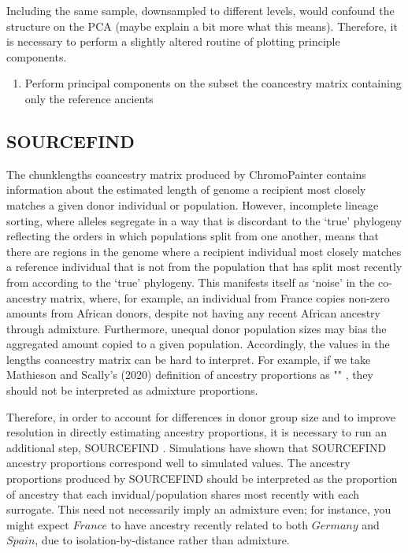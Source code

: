 Including the same sample, downsampled to different levels, would confound the structure on the PCA (maybe explain a bit more what this means). Therefore, it is necessary to perform a slightly altered routine of plotting principle components. 

\begin{enumerate}
\item Perform principal components on the subset the coancestry matrix containing only the reference ancients
\end{enumerate}



\subsection{SOURCEFIND}

The chunklengths coancestry matrix produced by ChromoPainter contains information about the estimated length of genome a recipient most closely matches a given donor individual or population. However, incomplete lineage sorting, where alleles segregate in a way that is discordant to the `true' phylogeny reflecting the orders in which populations split from one another, means that there are regions in the genome where a recipient individual most closely matches a reference individual that is not from the population that has split most recently from according to the `true' phylogeny. This manifests itself as `noise' in the co-ancestry matrix, where, for example, an individual from France copies non-zero amounts from African donors, despite not having any recent African ancestry through admixture.  Furthermore, unequal donor population sizes may bias the aggregated amount copied to a given population. Accordingly, the values in the lengths coancestry matrix can be hard to interpret. For example, if we take Mathieson and Scally's (2020) definition of ancestry proportions as "" \cite{mathieson2020ancestry}, they should not be interpreted as admixture proportions. 

Therefore, in order to account for differences in donor group size and to improve resolution in directly estimating ancestry proportions, it is necessary to run an additional step, SOURCEFIND \cite{Chacon-Duque2018}. Simulations have shown that SOURCEFIND ancestry proportions correspond well to simulated values. The ancestry proportions produced by SOURCEFIND should be interpreted as the proportion of ancestry that each invidual/population shares most recently with each surrogate. This need not necessarily imply an admixture even; for instance, you might expect $France$ to have ancestry recently related to both $Germany$ and $Spain$, due to isolation-by-distance rather than admixture. 

